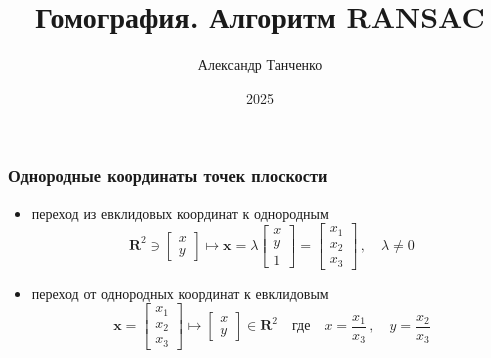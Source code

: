 \documentclass[12pt,usepdftitle=false,aspectratio=1610]{beamer}
\title[Лекция 7]{Гомография. Алгоритм RANSAC}
\author{Александр Танченко}
\institute{}
\date{2025}
\begin{document}
\begin{frame}
    \titlepage
\end{frame}

\begin{frame}
    \frametitle{Однородные координаты точек плоскости}
    \begin{itemize}
        \item переход из евклидовых координат к однородным
        $$
            \mathbf{R}^2\ni
            \begin{bmatrix}
                x\\ y
            \end{bmatrix}
            \mapsto 
            \mathbf{x}=
            \lambda
            \begin{bmatrix}
                x\\ y\\ 1
            \end{bmatrix}=
            \begin{bmatrix}
                x_1\\ x_2\\ x_3
            \end{bmatrix}\,,\quad
            \lambda \ne 0
        $$
        \item переход от однородных координат к евклидовым
        $$
            \mathbf{x}=
            \begin{bmatrix}
                x_1\\ x_2\\ x_3
            \end{bmatrix}
            \mapsto
            \begin{bmatrix}
                x\\ y
            \end{bmatrix}\in\mathbf{R}^2
            \quad\mbox{где}\quad
            x = \frac{x_1}{x_3}\,,\quad
            y = \frac{x_2}{x_3}
        $$
    \end{itemize}
\end{frame}
\end{document}
